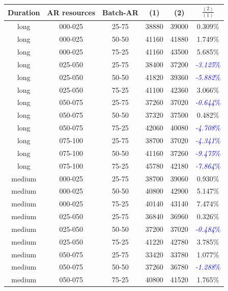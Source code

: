 \begin{table}
\begin{center}
\begin{tabular}{|c|c|c|c|c|c|}
\hline
\textbf{Duration} & \textbf{AR resources} & \textbf{Batch-AR} & \textbf{(1)} & \textbf{(2)} & \textbf{$\frac{(2)}{(1)}$}
\\\hline
long & 000-025 & 25-75 & 38880 & 39000 & 0.309\%
\\\hline
long & 000-025 & 50-50 & 41160 & 41880 & 1.749\%
\\\hline
long & 000-025 & 75-25 & 41160 & 43500 & 5.685\%
\\\hline
long & 025-050 & 25-75 & 38400 & 37200 & \textcolor{blue}{\textit{-3.125}\%}
\\\hline
long & 025-050 & 50-50 & 41820 & 39360 & \textcolor{blue}{\textit{-5.882}\%}
\\\hline
long & 025-050 & 75-25 & 41100 & 42360 & 3.066\%
\\\hline
long & 050-075 & 25-75 & 37260 & 37020 & \textcolor{blue}{\textit{-0.644}\%}
\\\hline
long & 050-075 & 50-50 & 37320 & 37500 & 0.482\%
\\\hline
long & 050-075 & 75-25 & 42060 & 40080 & \textcolor{blue}{\textit{-4.708}\%}
\\\hline
long & 075-100 & 25-75 & 38700 & 37020 & \textcolor{blue}{\textit{-4.341}\%}
\\\hline
long & 075-100 & 50-50 & 41160 & 37260 & \textcolor{blue}{\textit{-9.475}\%}
\\\hline
long & 075-100 & 75-25 & 45780 & 42180 & \textcolor{blue}{\textit{-7.864}\%}
\\\hline
medium & 000-025 & 25-75 & 38700 & 39060 & 0.930\%
\\\hline
medium & 000-025 & 50-50 & 40800 & 42900 & 5.147\%
\\\hline
medium & 000-025 & 75-25 & 40140 & 43140 & 7.474\%
\\\hline
medium & 025-050 & 25-75 & 36840 & 36960 & 0.326\%
\\\hline
medium & 025-050 & 50-50 & 37200 & 37020 & \textcolor{blue}{\textit{-0.484}\%}
\\\hline
medium & 025-050 & 75-25 & 41220 & 42780 & 3.785\%
\\\hline
medium & 050-075 & 25-75 & 33420 & 33780 & 1.077\%
\\\hline
medium & 050-075 & 50-50 & 37260 & 36780 & \textcolor{blue}{\textit{-1.288}\%}
\\\hline
medium & 050-075 & 75-25 & 40800 & 41520 & 1.765\%

\end{tabular}
\end{center}
\end{table}

